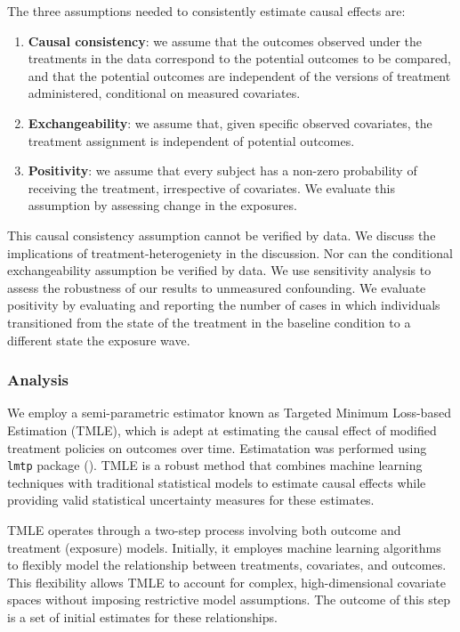 \documentclass[
  singlecolumn]{article}
\begin{document}
The three assumptions needed to consistently estimate causal effects
are:

\begin{enumerate}
\def\labelenumi{\arabic{enumi}.}
\item
  \textbf{Causal consistency}: we assume that the outcomes observed
  under the treatments in the data correspond to the potential outcomes
  to be compared, and that the potential outcomes are independent of the
  versions of treatment administered, conditional on measured
  covariates.
\item
  \textbf{Exchangeability}: we assume that, given specific observed
  covariates, the treatment assignment is independent of potential
  outcomes.
\item
  \textbf{Positivity}: we assume that every subject has a non-zero
  probability of receiving the treatment, irrespective of covariates. We
  evaluate this assumption by assessing change in the exposures.
\end{enumerate}

This causal consistency assumption cannot be verified by data. We
discuss the implications of treatment-heterogeniety in the discussion.
Nor can the conditional exchangeability assumption be verified by data.
We use sensitivity analysis to assess the robustness of our results to
unmeasured confounding. We evaluate positivity by evaluating and
reporting the number of cases in which individuals transitioned from the
state of the treatment in the baseline condition to a different state
the exposure wave.

\subsubsection{Analysis}\label{analysis}

We employ a semi-parametric estimator known as Targeted Minimum
Loss-based Estimation (TMLE), which is adept at estimating the causal
effect of modified treatment policies on outcomes over time.
Estimatation was performed using \texttt{lmtp} package
(). TMLE is a robust
method that combines machine learning techniques with traditional
statistical models to estimate causal effects while providing valid
statistical uncertainty measures for these estimates.

TMLE operates through a two-step process involving both outcome and
treatment (exposure) models. Initially, it employes machine learning
algorithms to flexibly model the relationship between treatments,
covariates, and outcomes. This flexibility allows TMLE to account for
complex, high-dimensional covariate spaces without imposing restrictive
model assumptions. The outcome of this step is a set of initial
estimates for these relationships.
\end{document}
